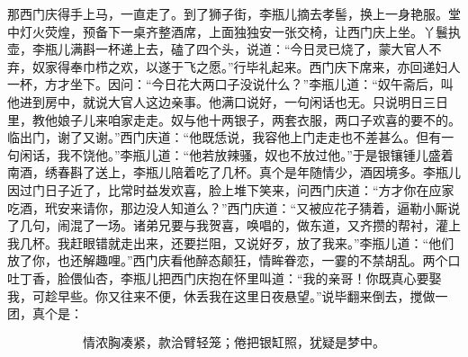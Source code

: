 那西门庆得手上马，一直走了。到了狮子街，李瓶儿摘去孝髻，换上一身艳服。堂中灯火荧煌，预备下一桌齐整酒席，上面独独安一张交椅，让西门庆上坐。丫鬟执壶，李瓶儿满斟一杯递上去，磕了四个头，说道：“今日灵已烧了，蒙大官人不弃，奴家得奉巾栉之欢，以遂于飞之愿。”行毕礼起来。西门庆下席来，亦回递妇人一杯，方才坐下。因问：“今日花大两口子没说什么？”李瓶儿道：“奴午斋后，叫他进到房中，就说大官人这边亲事。他满口说好，一句闲话也无。只说明日三日里，教他娘子儿来咱家走走。奴与他十两银子，两套衣服，两口子欢喜的要不的。临出门，谢了又谢。”西门庆道：“他既恁说，我容他上门走走也不差甚么。但有一句闲话，我不饶他。”李瓶儿道：“他若放辣骚，奴也不放过他。”于是银镶锺儿盛着南酒，绣春斟了送上，李瓶儿陪着吃了几杯。真个是年随情少，酒因境多。李瓶儿因过门日子近了，比常时益发欢喜，脸上堆下笑来，问西门庆道：“方才你在应家吃酒，玳安来请你，那边没人知道么？”西门庆道：“又被应花子猜着，逼勒小厮说了几句，闹混了一场。诸弟兄要与我贺喜，唤唱的，做东道，又齐攒的帮衬，灌上我几杯。我赶眼错就走出来，还要拦阻，又说好歹，放了我来。”李瓶儿道：“他们放了你，也还解趣哩。”西门庆看他醉态颠狂，情眸眷恋，一霎的不禁胡乱。两个口吐丁香，脸偎仙杏，李瓶儿把西门庆抱在怀里叫道：“我的亲哥！你既真心要娶我，可趁早些。你又往来不便，休丢我在这里日夜悬望。”说毕翻来倒去，搅做一团，真个是：

\[
情浓胸凑紧，款洽臂轻笼；
倦把银缸照，犹疑是梦中。
\]
